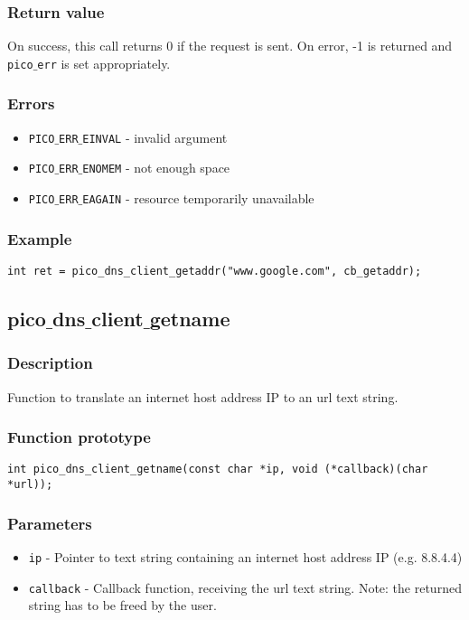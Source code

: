\subsubsection*{Return value}
On success, this call returns 0 if the request is sent.
On error, -1 is returned and \texttt{pico$\_$err} is set appropriately.

\subsubsection*{Errors}
\begin{itemize}[noitemsep]
\item \texttt{PICO$\_$ERR$\_$EINVAL} - invalid argument
\item \texttt{PICO$\_$ERR$\_$ENOMEM} - not enough space
\item \texttt{PICO$\_$ERR$\_$EAGAIN} - resource temporarily unavailable
\end{itemize}

\subsubsection*{Example}
\begin{verbatim}
int ret = pico_dns_client_getaddr("www.google.com", cb_getaddr);
\end{verbatim}



\subsection{pico$\_$dns$\_$client$\_$getname}

\subsubsection*{Description}
Function to translate an internet host address IP to an url text string.

\subsubsection*{Function prototype}
\begin{verbatim}
int pico_dns_client_getname(const char *ip, void (*callback)(char *url));
\end{verbatim}

\subsubsection*{Parameters}
\begin{itemize}[noitemsep]
\item \texttt{ip} - Pointer to text string containing an internet host address IP (e.g. 8.8.4.4)
\item \texttt{callback} - Callback function, receiving the url text string. Note: the returned string has to be freed by the user.
\end{itemize}

